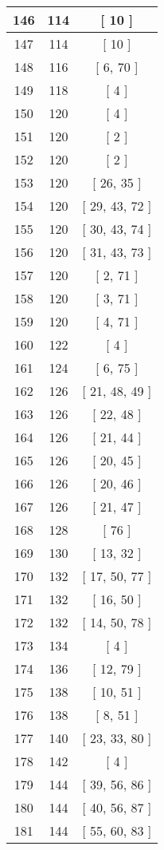 \begin{center}
\begin{longtable}[H]{|| c c c ||}
\hline
146 & 114 & [ 10 ] \\ 
\hline
147 & 114 & [ 10 ] \\ 
\hline
148 & 116 & [ 6, 70 ] \\ 
\hline
149 & 118 & [ 4 ] \\ 
\hline
150 & 120 & [ 4 ] \\ 
\hline
151 & 120 & [ 2 ] \\ 
\hline
152 & 120 & [ 2 ] \\ 
\hline
153 & 120 & [ 26, 35 ] \\ 
\hline
154 & 120 & [ 29, 43, 72 ] \\ 
\hline
155 & 120 & [ 30, 43, 74 ] \\ 
\hline
156 & 120 & [ 31, 43, 73 ] \\ 
\hline
157 & 120 & [ 2, 71 ] \\ 
\hline
158 & 120 & [ 3, 71 ] \\ 
\hline
159 & 120 & [ 4, 71 ] \\ 
\hline
160 & 122 & [ 4 ] \\ 
\hline
161 & 124 & [ 6, 75 ] \\ 
\hline
162 & 126 & [ 21, 48, 49 ] \\ 
\hline
163 & 126 & [ 22, 48 ] \\ 
\hline
164 & 126 & [ 21, 44 ] \\ 
\hline
165 & 126 & [ 20, 45 ] \\ 
\hline
166 & 126 & [ 20, 46 ] \\ 
\hline
167 & 126 & [ 21, 47 ] \\ 
\hline
168 & 128 & [ 76 ] \\ 
\hline
169 & 130 & [ 13, 32 ] \\ 
\hline
170 & 132 & [ 17, 50, 77 ] \\ 
\hline
171 & 132 & [ 16, 50 ] \\ 
\hline
172 & 132 & [ 14, 50, 78 ] \\ 
\hline
173 & 134 & [ 4 ] \\ 
\hline
174 & 136 & [ 12, 79 ] \\ 
\hline
175 & 138 & [ 10, 51 ] \\ 
\hline
176 & 138 & [ 8, 51 ] \\ 
\hline
177 & 140 & [ 23, 33, 80 ] \\ 
\hline
178 & 142 & [ 4 ] \\ 
\hline
179 & 144 & [ 39, 56, 86 ] \\ 
\hline
180 & 144 & [ 40, 56, 87 ] \\ 
\hline
181 & 144 & [ 55, 60, 83 ] \\ 

\end{longtable}
\end{center}
